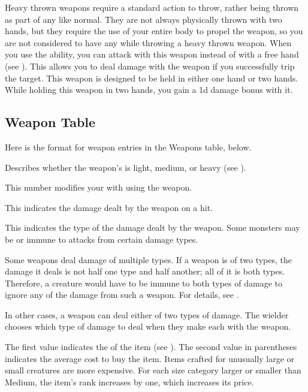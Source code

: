         Heavy thrown weapons require a standard action to throw, rather being thrown as part of any  like normal.
        They are not always physically thrown with two hands, but they require the use of your entire body to propel the weapon, so you are not considered to have any  while throwing a heavy thrown weapon.
         When you use the  ability, you can attack with this weapon instead of with a free hand (see ).
        This allows you to deal damage with the weapon if you successfully trip the target.
         This weapon is designed to be held in either one hand or two hands.
        While holding this weapon in two hands, you gain a \plus1d damage bonus with it.

    \subsection{Weapon Table}
        Here is the format for weapon entries in the Weapons table, below.

         Describes whether the weapon's  is light, medium, or heavy (see ).

         This number modifies your  with  using the weapon.

         This  indicates the damage dealt by the weapon on a hit.

         This indicates the type of the damage dealt by the weapon.
        Some monsters may be  or immune to attacks from certain damage types.

        Some weapons deal damage of multiple types. If a weapon is of two types, the damage it deals is not half one type and half another; all of it is both types.
        Therefore, a creature would have to be immune to both types of damage to ignore any of the damage from such a weapon.
        For details, see .

        In other cases, a weapon can deal either of two types of damage.
        The wielder chooses which type of damage to deal when they make each  with the weapon.

         The first value indicates the  of the item (see ).
        The second value in parentheses indicates the average cost to buy the item.
        Items crafted for unusually large or small creatures are more expensive.
        For each size category larger or smaller than Medium, the item's rank increases by one, which increases its price.

